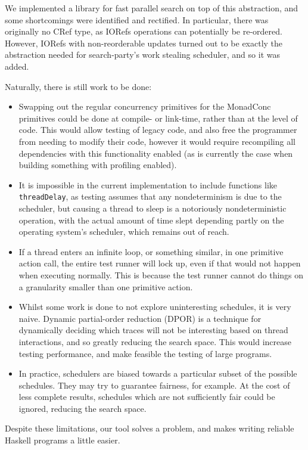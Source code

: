 We implemented a library for fast parallel search on top of this
abstraction, and some shortcomings were identified and rectified. In
particular, there was originally no CRef type, as IORefs operations
can potentially be re-ordered\cite{ioref}. However, IORefs with
non-reorderable updates turned out to be exactly the abstraction
needed for search-party's work stealing scheduler, and so it was
added.

Naturally, there is still work to be done:

\begin{itemize}
  \item Swapping out the regular concurrency primitives for the
    MonadConc primitives could be done at compile- or link-time, rather
    than at the level of code. This would allow testing of legacy code,
    and also free the programmer from needing to modify their code,
    however it would require recompiling all dependencies with this
    functionality enabled (as is currently the case when building
    something with profiling enabled).

  \item It is impossible in the current implementation to include
    functions like \texttt{threadDelay}, as testing assumes that any
    nondeterminism is due to the scheduler, but causing a thread to
    sleep is a notoriously nondeterministic operation, with the actual
    amount of time slept depending partly on the operating system's
    scheduler, which remains out of reach.

  \item If a thread enters an infinite loop, or something similar, in
    one primitive action call, the entire test runner will lock up,
    even if that would not happen when executing normally. This is
    because the test runner cannot do things on a granularity smaller
    than one primitive action.

  \item Whilst some work is done to not explore uninteresting
    schedules, it is very naive. Dynamic partial-order reduction
    (DPOR)\cite{dpor} is a technique for dynamically deciding which
    traces will not be interesting based on thread interactions, and
    so greatly reducing the search space. This would increase testing
    performance, and make feasible the testing of large programs.

  \item In practice, schedulers are biased towards a particular subset
    of the possible schedules. They may try to guarantee fairness, for
    example. At the cost of less complete results, schedules which are
    not sufficiently fair could be ignored, reducing the search space.
\end{itemize}

Despite these limitations, our tool solves a problem, and makes
writing reliable Haskell programs a little easier.
